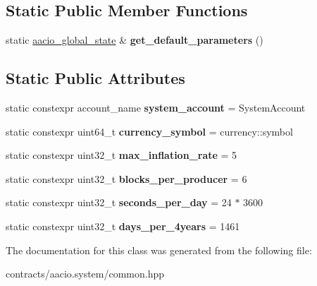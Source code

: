 \subsection*{Static Public Member Functions}
\begin{DoxyCompactItemize}
\item 
\mbox{\label{classaaciosystem_1_1common_a995012673963700d7cf11f92eed22792}} 
static \mbox{\hyperlink{structaaciosystem_1_1common_1_1aacio__global__state}{aacio\+\_\+global\+\_\+state}} \& {\bfseries get\+\_\+default\+\_\+parameters} ()
\end{DoxyCompactItemize}
\subsection*{Static Public Attributes}
\begin{DoxyCompactItemize}
\item 
\mbox{\label{classaaciosystem_1_1common_a4da9f0ea6eee7bef803bf8c592712bfe}} 
static constexpr account\+\_\+name {\bfseries system\+\_\+account} = System\+Account
\item 
\mbox{\label{classaaciosystem_1_1common_a7182a8e7f69c1038a9fba3b5933e5854}} 
static constexpr uint64\+\_\+t {\bfseries currency\+\_\+symbol} = currency\+::symbol
\item 
\mbox{\label{classaaciosystem_1_1common_a7574e8897f73ac5efbaf01f9b7ac9483}} 
static constexpr uint32\+\_\+t {\bfseries max\+\_\+inflation\+\_\+rate} = 5
\item 
\mbox{\label{classaaciosystem_1_1common_af9b28615f1e85a1b31f541aae55826fd}} 
static constexpr uint32\+\_\+t {\bfseries blocks\+\_\+per\+\_\+producer} = 6
\item 
\mbox{\label{classaaciosystem_1_1common_a1e9861d921eb78deb2c035a49dd9becf}} 
static constexpr uint32\+\_\+t {\bfseries seconds\+\_\+per\+\_\+day} = 24 $\ast$ 3600
\item 
\mbox{\label{classaaciosystem_1_1common_ab351a39ba7202bc53d9135dfe3162d3d}} 
static constexpr uint32\+\_\+t {\bfseries days\+\_\+per\+\_\+4years} = 1461
\end{DoxyCompactItemize}


The documentation for this class was generated from the following file\+:\begin{DoxyCompactItemize}
\item 
contracts/aacio.\+system/common.\+hpp\end{DoxyCompactItemize}

